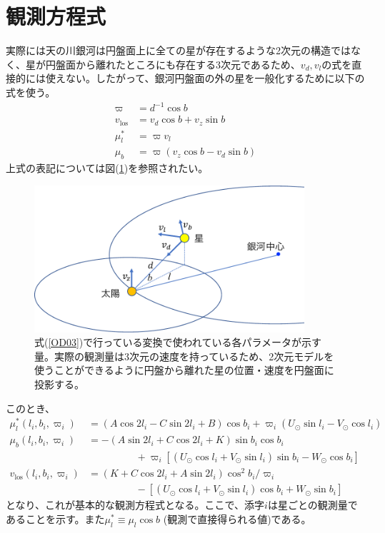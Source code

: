 \section{観測方程式}
実際には天の川銀河は円盤面上に全ての星が存在するような2次元の構造ではなく、星が円盤面から離れたところにも存在する3次元であるため、$v_d,v_l$の式を直接的には使えない。したがって、銀河円盤面の外の星を一般化するために以下の式を使う。
\begin{subequations}
\begin{align}
	\varpi &= d^{-1} \cos b \\
	v_{\mathrm{los}} &= v_d \cos b + v_z \sin b \\
	\mu^*_l &= \varpi v_l \\
	\mu_b &= \varpi(v_z \cos b - v_d \sin b)
\end{align} \label{OD03}
\end{subequations}
上式の表記については図(\ref{fig:OD03})を参照されたい。
\begin{figure}[htbp]
	\centering
	\includegraphics[width=10cm]{fig/figOD2003_2.pdf}
	\caption{式(\ref{OD03})で行っている変換で使われている各パラメータが示す量。実際の観測量は3次元の速度を持っているため、2次元モデルを使うことができるように円盤から離れた星の位置・速度を円盤面に投影する。}
	\label{fig:OD03}
\end{figure}
このとき、
\begin{subequations}
\begin{align}
	\mu^*_l(l_i,b_i,\varpi_i) &= (A\cos2l_i - C\sin2l_i + B)\cos b_i + \varpi_i(U_{\odot}\sin l_i - V_{\odot}\cos l_i) \\
	\mu_b(l_i,b_i,\varpi_i) &= -(A\sin2l_i + C\cos2l_i + K)\sin b_i \cos b_i \nonumber \\
	                          & \hspace{2cm} + \varpi_i[(U_{\odot}\cos l_i + V_{\odot} \sin l_i)\sin b_i - W_{\odot} \cos b_i] \\
	v_{\mathrm{los}}(l_i,b_i,\varpi_i) &= (K + C\cos2l_i + A\sin2l_i)\cos^2 b_i / \varpi_i \nonumber \\
	                      & \hspace{2cm} - [(U_{\odot}\cos l_i + V_{\odot} \sin l_i)\cos b_i + W_{\odot} \sin b_i]
\end{align} \label{ObsEq}
\end{subequations}
となり、これが基本的な観測方程式となる。ここで、添字$i$は星ごとの観測量であることを示す。また$\mu^*_l \equiv \mu_l \cos b$ (観測で直接得られる値)である。

